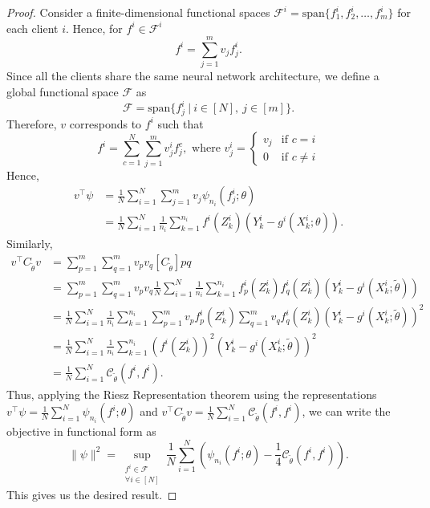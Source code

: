 \documentclass{article}
\def\gC{{\mathcal{C}}}
\def\gF{{\mathcal{F}}}
\theoremstyle{definition}
\begin{document}
\begin{proof}
    Consider a finite-dimensional functional spaces $\gF^i=\text{span}\{f_1^i, f_2^i, \dots, f_m^i\}$ for each client $i$. Hence, for $f^i\in\gF^i$ 
    \begin{equation*}
        f^i=\sum_{j=1}^{m}v_jf^i_j.
    \end{equation*}
Since all the clients share the same neural network architecture, we define a global functional space $\gF$ as 
\begin{equation*}
    \gF=\text{span}\{f^i_j~\vert~i\in[N],~j\in[m]\}.
\end{equation*}
Therefore, $v$ corresponds to $f^i$ such that \begin{equation*}
    f^i=\sum_{c=1}^{N}\sum_{j=1}^{m}v^i_j f^c_j,
\text{ where }
    v^i_j=
 \begin{cases}
        v_j & \text{if } c =i\\
        0 & \text{if } c \neq i
    \end{cases}
    \end{equation*}
Hence, 
\begin{align*}
v^\top\psi&=\frac{1}{N}\sum_{i=1}^{N}\sum_{j=1}^{m}v_j\psi_{n_i}(f^i_j;\theta)\\
&=\frac{1}{N}\sum_{i=1}^{N}\frac{1}{n_i}\sum_{k=1}^{n_i}f^i(Z_k^i)(Y^i_k-g^i(X^i_k;\theta)).
\end{align*} 
Similarly, 
\begin{align*}
v^\top C_{\tilde{\theta}}v&=\sum_{p=1}^{m}\sum_{q=1}^{m}v_pv_q[C_{\tilde{\theta}}]pq\\
&=\sum_{p=1}^{m}\sum_{q=1}^{m}v_pv_q\frac{1}{N}\sum_{i=1}^{N}\frac{1}{n_i}\sum_{k=1}^{n_i}f^i_p(Z^i_k)f_q^i(Z_k^i)(Y_k^i-g^i(X_k^i;\tilde\theta))\\
&=\frac{1}{N}\sum_{i=1}^{N}\frac{1}{n_i}\sum_{k=1}^{n_i}\sum_{p=1}^{m}v_pf^i_p(Z^i_k)\sum_{q=1}^{m}v_q f_q^i(Z_k^i)(Y_k^i-g^i(X_k^i;\tilde\theta))^2\\
&=\frac{1}{N}\sum_{i=1}^{N}\frac{1}{n_i}\sum_{k=1}^{n_i}(f^i(Z^i_k))^2(Y_k^i-g^i(X_k^i;\tilde\theta))^2\\
&=\frac{1}{N}\sum_{i=1}^{N}\gC_{\tilde\theta}(f^i,f^i).
\end{align*}
Thus, applying the Riesz Representation theorem using the representations $v^\top\psi=\frac{1}{N}\sum_{i=1}^{N}\psi_{n_i}(f^i;\theta)$ and $v^\top C_{\tilde{\theta}}v=\frac{1}{N}\sum_{i=1}^{N}\gC_{\tilde{\theta}}(f^i,f^i)$, we can write the objective in functional form as
      \begin{equation*}
    \|\psi\|^2 = 
    \sup_{\substack{f^i\in \mathcal{F}\\ \forall i\in[N]}}
       \frac{1}{N} \sum_{i=1}^N\left( 
  \psi_{n_i}(f^i; \theta) 
    - \frac{1}{4}\mathcal{C}_{\tilde{\theta}}(f^i, f^i) 
    \right).
    \end{equation*}
This gives us the desired result.

\end{proof}
\end{document}
